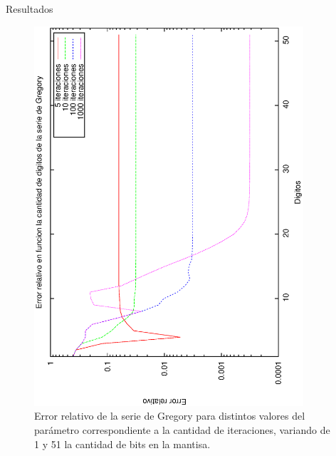 \begin{section}{Resultados}
	\begin{figure}[H]
	  \centering
		\includegraphics[width=10cm,angle=-90]{graficos/gregory_1a51p.eps}
	  \caption{Error relativo de la serie de Gregory para distintos valores del parámetro correspondiente a la cantidad de iteraciones, variando de 1 y 51 la cantidad de bits en la mantisa.}
	  \label{fig:gregory_51p}
	\end{figure}
	
	\VSP
	

\end{section}
